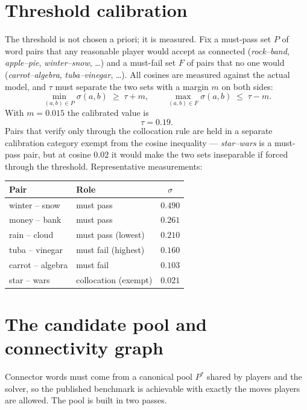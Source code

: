 \documentclass[11pt]{article}
\theoremstyle{definition}
\newcommand{\cosim}{\sigma}
\newcommand{\thresh}{\tau}
\begin{document}
\section{Threshold calibration}

The threshold is not chosen a priori; it is measured. Fix a must-pass set $P$
of word pairs that any reasonable player would accept as connected
(\emph{rock--band}, \emph{apple--pie}, \emph{winter--snow}, \dots) and a
must-fail set $F$ of pairs that no one would (\emph{carrot--algebra},
\emph{tuba--vinegar}, \dots). All cosines are measured against the actual
model, and $\thresh$ must separate the two sets with a margin $m$ on both
sides:
\[
  \min_{(a,b) \in P} \cosim(a,b) \;\ge\; \thresh + m,
  \qquad
  \max_{(a,b) \in F} \cosim(a,b) \;\le\; \thresh - m .
\]
With $m = 0.015$ the calibrated value is
\[
  \boxed{\thresh = 0.19}.
\]
Pairs that verify only through the collocation rule are held in a separate
calibration category exempt from the cosine inequality --- \emph{star--wars}
is a must-pass pair, but at cosine $0.02$ it would make the two sets
inseparable if forced through the threshold. Representative measurements:

\begin{center}
\begin{tabular}{llc}
\toprule
Pair & Role & $\cosim$ \\
\midrule
winter -- snow    & must pass                & $0.490$ \\
money -- bank     & must pass                & $0.261$ \\
rain -- cloud     & must pass (lowest)       & $0.210$ \\
tuba -- vinegar   & must fail (highest)      & $0.160$ \\
carrot -- algebra & must fail                & $0.103$ \\
star -- wars      & collocation (exempt)     & $0.021$ \\
\bottomrule
\end{tabular}
\end{center}

\section{The candidate pool and connectivity graph}

Connector words must come from a canonical pool $P^\ast$ shared by players and
the solver, so the published benchmark is achievable with exactly the moves
players are allowed. The pool is built in two passes.
\end{document}
